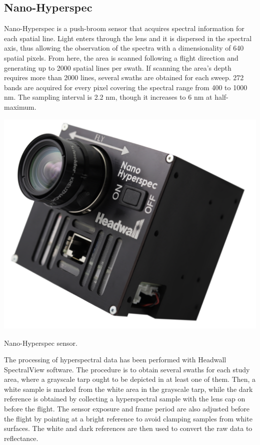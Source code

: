 \subsection{Nano-Hyperspec}

Nano-Hyperspec is a push-broom sensor that acquires spectral information for each spatial line. Light enters through the lens and it is dispersed in the spectral axis, thus allowing the observation of the spectra with a dimensionality of 640 spatial pixels. From here, the area is scanned following a flight direction and generating up to 2000 spatial lines per swath. If scanning the area's depth requires more than 2000 lines, several swaths are obtained for each sweep. 272 bands are acquired for every pixel covering the spectral range from 400 to 1000 \si{\nano\meter}. The sampling interval is 2.2 \si{\nano\meter}, though it increases to 6 \si{\nano\meter} at half-maximum.

\begin{marginfigure}[-3.0cm]
	\includegraphics{figs/materials/nano_hyperspec.png}
	\caption{Nano-Hyperspec sensor.}
	\label{fig:nano_hyperspec}
\end{marginfigure}

The processing of hyperspectral data has been performed with Headwall SpectralView\texttrademark \hspace{1mm} software. The procedure is to obtain several swaths for each study area, where a grayscale tarp ought to be depicted in at least one of them. Then, a white sample is marked from the white area in the grayscale tarp, while the dark reference is obtained by collecting a hyperspectral sample with the lens cap on before the flight. The sensor exposure and frame period are also adjusted before the flight by pointing at a bright reference to avoid clamping samples from white surfaces. The white and dark references are then used to convert the raw data to reflectance. 

